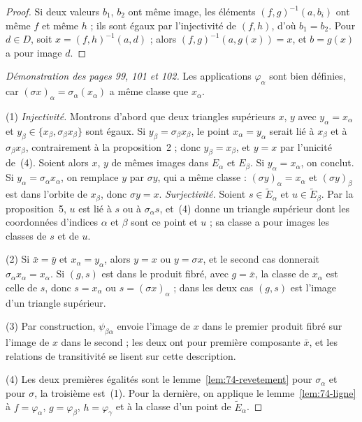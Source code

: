 \begin{proof}
Si deux valeurs $b_1$, $b_2$ ont même image, les éléments $(f, g)^{-1}(a, b_i)$ ont même $f$ et même $h$ ; ils sont égaux par l'injectivité de $(f, h)$, d'où $b_1 = b_2$. Pour $d \in D$, soit $x = (f, h)^{-1}(a, d)$ ; alors $(f, g)^{-1}(a, g(x)) = x$, et $b = g(x)$ a pour image $d$.
\end{proof}

\begin{proof}[Démonstration des pages 99, 101 et 102]
Les applications $\varphi_\alpha$ sont bien définies, car $(\sigma x)_\alpha = \sigma_\alpha(x_\alpha)$ a même classe que $x_\alpha$.

(1) \emph{Injectivité.} Montrons d'abord que deux triangles supérieurs $x$, $y$ avec $y_\alpha = x_\alpha$ et $y_\beta \in \{x_\beta, \sigma_\beta x_\beta\}$ sont égaux. Si $y_\beta = \sigma_\beta x_\beta$, le point $x_\alpha = y_\alpha$ serait lié à $x_\beta$ et à $\sigma_\beta x_\beta$, contrairement à la proposition~2 ; donc $y_\beta = x_\beta$, et $y = x$ par l'unicité de~(4). Soient alors $x$, $y$ de mêmes images dans $E_\alpha$ et $E_\beta$. Si $y_\alpha = x_\alpha$, on conclut. Si $y_\alpha = \sigma_\alpha x_\alpha$, on remplace $y$ par $\sigma y$, qui a même classe : $(\sigma y)_\alpha = x_\alpha$ et $(\sigma y)_\beta$ est dans l'orbite de $x_\beta$, donc $\sigma y = x$. \emph{Surjectivité.} Soient $s \in \widetilde E_\alpha$ et $u \in \widetilde E_\beta$. Par la proposition~5, $u$ est lié à $s$ ou à $\sigma_\alpha s$, et~(4) donne un triangle supérieur dont les coordonnées d'indices $\alpha$ et $\beta$ sont ce point et $u$ ; sa classe a pour images les classes de $s$ et de $u$.

(2) Si $\bar x = \bar y$ et $x_\alpha = y_\alpha$, alors $y = x$ ou $y = \sigma x$, et le second cas donnerait $\sigma_\alpha x_\alpha = x_\alpha$. Si $(g, s)$ est dans le produit fibré, avec $g = \bar x$, la classe de $x_\alpha$ est celle de $s$, donc $s = x_\alpha$ ou $s = (\sigma x)_\alpha$ ; dans les deux cas $(g, s)$ est l'image d'un triangle supérieur.

(3) Par construction, $\psi_{\beta\alpha}$ envoie l'image de $x$ dans le premier produit fibré sur l'image de $x$ dans le second ; les deux ont pour première composante $\bar x$, et les relations de transitivité se lisent sur cette description.

(4) Les deux premières égalités sont le lemme~\ref{lem:74-revetement} pour $\sigma_\alpha$ et pour $\sigma$, la troisième est~(1). Pour la dernière, on applique le lemme~\ref{lem:74-ligne} à $f = \varphi_\alpha$, $g = \varphi_\beta$, $h = \varphi_\gamma$ et à la classe d'un point de $\widetilde E_\alpha$.
\end{proof}

